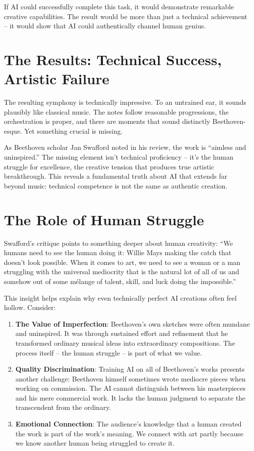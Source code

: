 \documentclass[
  Letterpaper,
]{scrbook}
\begin{document}
If AI could successfully complete this task, it would demonstrate
remarkable creative capabilities. The result would be more than just a
technical achievement -- it would show that AI could authentically
channel human genius.

\section{The Results: Technical Success, Artistic
Failure}\label{the-results-technical-success-artistic-failure}

The resulting symphony is technically impressive. To an untrained ear,
it sounds plausibly like classical music. The notes follow reasonable
progressions, the orchestration is proper, and there are moments that
sound distinctly Beethoven-esque. Yet something crucial is missing.

As Beethoven scholar Jan Swafford noted in his review, the work is
``aimless and uninspired.'' The missing element isn't technical
proficiency -- it's the human struggle for excellence, the creative
tension that produces true artistic breakthrough. This reveals a
fundamental truth about AI that extends far beyond music: technical
competence is not the same as authentic creation.

\section{The Role of Human Struggle}\label{the-role-of-human-struggle}

Swafford's critique points to something deeper about human creativity:
``We humans need to see the human doing it: Willie Mays making the catch
that doesn't look possible. When it comes to art, we need to see a woman
or a man struggling with the universal mediocrity that is the natural
lot of all of us and somehow out of some mélange of talent, skill, and
luck doing the impossible.''

This insight helps explain why even technically perfect AI creations
often feel hollow. Consider:

\begin{enumerate}
\def\labelenumi{\arabic{enumi}.}
\item
  \textbf{The Value of Imperfection}: Beethoven's own sketches were
  often mundane and uninspired. It was through sustained effort and
  refinement that he transformed ordinary musical ideas into
  extraordinary compositions. The process itself -- the human struggle
  -- is part of what we value.
\item
  \textbf{Quality Discrimination}: Training AI on all of Beethoven's
  works presents another challenge: Beethoven himself sometimes wrote
  mediocre pieces when working on commission. The AI cannot distinguish
  between his masterpieces and his mere commercial work. It lacks the
  human judgment to separate the transcendent from the ordinary.
\item
  \textbf{Emotional Connection}: The audience's knowledge that a human
  created the work is part of the work's meaning. We connect with art
  partly because we know another human being struggled to create it.
\end{enumerate}
\end{document}
